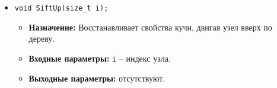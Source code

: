 \begin{itemize}
    \item \texttt{void SiftUp(size\_t i);}
    \begin{itemize}
        \item \textbf{Назначение:} Восстанавливает свойства кучи, двигая узел вверх по дереву.
        \item \textbf{Входные параметры:} \texttt{i} -- индекс узла.
        \item \textbf{Выходные параметры:} отсутствуют.
    \end{itemize}
\end{itemize}


